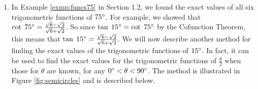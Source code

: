 {\begin{enumerate}[\bfseries 1.]
{}
\par\noindent For Exercises \ref{exer:solvrtfirst}-\ref{exer:solvrtlast}, solve the right triangle
in Figure \ref{fig:exersolveright} using the\\given information.
[{[\bfseries 1.]}]
[{[\bfseries 1.]}]
 \item In Example \ref{exmp:funcs75} in Section 1.2, we found the exact values of all six
 trigonometric functions of $75^\circ$. For example, we showed that $\cot\;75^\circ =
 \frac{\sqrt{6} -
 \sqrt{2}}{\sqrt{6} + \sqrt{2}}$. So since $\tan\;15^\circ = \cot\;75^\circ$ by the Cofunction
 Theorem, this means that $\tan\;15^\circ = \frac{\sqrt{6} - \sqrt{2}}{\sqrt{6} + \sqrt{2}}$. We
 will now describe another method for finding the exact values of the trigonometric functions of
 $15^\circ$. In fact, it can be used to find the exact values for the trigonometric functions of
 $\frac{\theta}{2}$ when those for $\theta$ are known, for any $0^\circ < \theta < 90^\circ$.
 The method is illustrated in Figure \ref{fig:semicircles} and is described below.\vspace{2mm}


\end{enumerate}}
